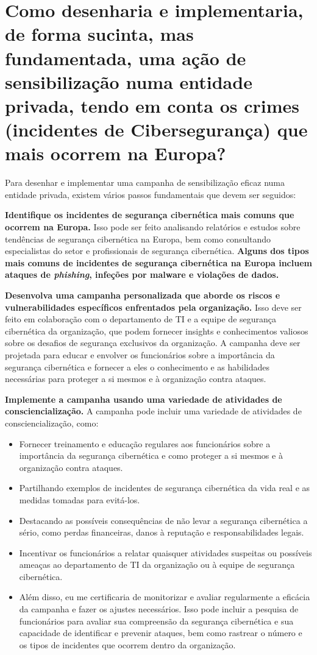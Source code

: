 \section[Pergunta 5]{Como desenharia e implementaria, de forma sucinta, mas fundamentada, uma ação de sensibilização numa entidade privada, tendo em conta os crimes (incidentes de Cibersegurança) que mais ocorrem na Europa?}

Para desenhar e implementar uma campanha de sensibilização eficaz numa entidade privada, existem vários passos fundamentais que devem ser seguidos:

\textbf{Identifique os incidentes de segurança cibernética mais comuns que ocorrem na Europa.} Isso pode ser feito analisando relatórios e estudos sobre tendências de segurança cibernética na Europa, bem como consultando especialistas do setor e profissionais de segurança cibernética. \textbf{Alguns dos tipos mais comuns de incidentes de segurança cibernética na Europa incluem ataques de \textit{phishing}, infeções por malware e violações de dados.}

\textbf{Desenvolva uma campanha personalizada que aborde os riscos e vulnerabilidades específicos enfrentados pela organização.} Isso deve ser feito em colaboração com o departamento de TI e a equipe de segurança cibernética da organização, que podem fornecer insights e conhecimentos valiosos sobre os desafios de segurança exclusivos da organização. A campanha deve ser projetada para educar e envolver os funcionários sobre a importância da segurança cibernética e fornecer a eles o conhecimento e as habilidades necessárias para proteger a si mesmos e à organização contra ataques.

\textbf{Implemente a campanha usando uma variedade de atividades de consciencialização.} A campanha pode incluir uma variedade de atividades de consciencialização, como:

\begin{itemize}
  \item Fornecer treinamento e educação regulares aos funcionários sobre a importância da segurança cibernética e como proteger a si mesmos e à organização contra ataques.
  \item Partilhando exemplos de incidentes de segurança cibernética da vida real e as medidas tomadas para evitá-los.
  \item Destacando as possíveis consequências de não levar a segurança cibernética a sério, como perdas financeiras, danos à reputação e responsabilidades legais.
  \item Incentivar os funcionários a relatar quaisquer atividades suspeitas ou possíveis ameaças ao departamento de TI da organização ou à equipe de segurança cibernética.
  \item Além disso, eu me certificaria de monitorizar e avaliar regularmente a eficácia da campanha e fazer os ajustes necessários. Isso pode incluir a pesquisa de funcionários para avaliar sua compreensão da segurança cibernética e sua capacidade de identificar e prevenir ataques, bem como rastrear o número e os tipos de incidentes que ocorrem dentro da organização.
\end{itemize}

